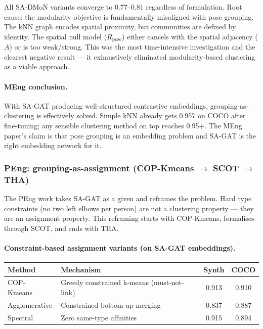 \vspace{0.5em}

All SA-DMoN variants converge to 0.77--0.81 regardless of formulation. Root cause: the modularity objective is fundamentally misaligned with pose grouping. The kNN graph encodes spatial proximity, but communities are defined by identity. The spatial null model ($R_{\text{pose}}$) either cancels with the spatial adjacency ($A$) or is too weak/strong. This was the most time-intensive investigation and the clearest negative result --- it exhaustively eliminated modularity-based clustering as a viable approach.

\paragraph{MEng conclusion.} With SA-GAT producing well-structured contrastive embeddings, grouping-as-clustering is effectively solved. Simple kNN already gets 0.957 on COCO after fine-tuning; any sensible clustering method on top reaches 0.95+. The MEng paper's claim is that pose grouping is an embedding problem and SA-GAT is the right embedding network for it.


\subsubsection{PEng: grouping-as-assignment (COP-Kmeans $\to$ SCOT $\to$ THA)}

The PEng work takes SA-GAT as a given and reframes the problem. Hard type constraints (no two left elbows per person) are not a clustering property --- they are an assignment property. This reframing starts with COP-Kmeans, formalises through SCOT, and ends with THA.

\paragraph{Constraint-based assignment variants (on SA-GAT embeddings).}

\begin{tabular}{llcc}
\hline
\textbf{Method} & \textbf{Mechanism} & \textbf{Synth} & \textbf{COCO} \\
\hline
COP-Kmeans~\cite{wagstaff2001copkmeans} & Greedy constrained k-means (must-not-link) & 0.913 & 0.910 \\
Agglomerative & Constrained bottom-up merging & 0.837 & 0.887 \\
Spectral & Zero same-type affinities & 0.915 & 0.894 \\
\hline
\end{tabular}

